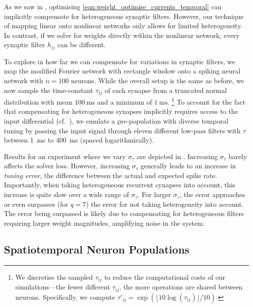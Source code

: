 As we saw in , optimising \cref{eqn:weight_optimise_currents_temporal} can implicitly compensate for heterogeneous synaptic filters.
However, our technique of mapping linear onto nonlinear networks only allows for limited heterogeneity.
In contrast, if we solve for weights directly within the nonlinear network, every synaptic filter $h_{ij}$ can be different.

To explore in how far we can compensate for variations in synaptic filters, we map the modified Fourier network with rectangle window onto a spiking neural network with $n = 100$ neurons.
While the overall setup is the same as before, we now sample the time-constant $\tau_{ij}$ of each synapse from a truncated normal distribution with mean $\SI{100}{\milli\second}$ and a minimum of $\SI{1}{\milli\second}$.%
\footnote{We discretise the sampled $\tau_{ij}$ to reduce the computational costs of our simulations---the fewer different $\tau_{ij}$, the more operations are shared between neurons.
Specifically, we compute $\tau'_{ij} = \exp(\lfloor 10 \log(\tau_{ij}) \rfloor / 10)$.
}
To account for the fact that compensating for heterogeneous synapses implicitly requires access to the input differential (cf.~), we emulate a pre-population with diverse temporal tuning by passing the input signal through eleven different low-pass filters with $\tau$ between \SI{1}{\milli\second} to \SI{400}{\milli\second} (spaced logarithmically).

Results for an experiment where we vary $\sigma_\tau$ are depicted in .
Increasing $\sigma_\tau$ barely affects the solver loss.
However, increasing $\sigma_\tau$ generally leads to an increase in \emph{tuning error}, the difference between the actual and expected spike rate.
Importantly, when taking heterogeneous recurrent synapses into account, this increase is quite slow over a wide range of $\sigma_\tau$.
For larger $\sigma_\tau$, the error approaches or even surpasses (for $q = 7$) the error for not taking heterogeneity into account.
The error being surpassed is likely due to compensating for heterogeneous filters requiring larger weight magnitudes, amplifying noise in the system.

\subsection{Spatiotemporal Neuron Populations}
\label{sec:spatiotemporal}

